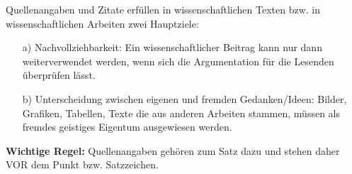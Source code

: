
Quellenangaben und Zitate erfüllen in wissenschaftlichen Texten bzw. in wissenschaftlichen Arbeiten zwei Hauptziele\cite{NW2017}: 

\begin{itemize}

\item[a)] Nachvollziehbarkeit: Ein wissenschaftlicher Beitrag kann nur dann weiterverwendet werden, wenn sich die Argumentation für die Lesenden überprüfen lässt.

\item[b)] Unterscheidung zwischen eigenen und fremden Gedanken/Ideen: Bilder, Grafiken, Tabellen, Texte die aus anderen Arbeiten stammen, müssen als fremdes geistiges Eigentum ausgewiesen werden.

\end{itemize}

\textbf{Wichtige Regel:} Quellenangaben gehören zum Satz dazu und stehen daher VOR dem Punkt bzw. Satzzeichen.
